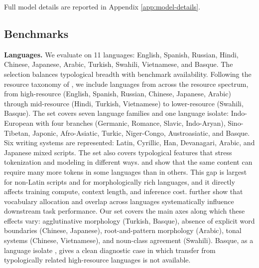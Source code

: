 \documentclass{article}
\begin{document}
Full model details are reported in Appendix \ref{app:model-details}.

\subsection{Benchmarks}
\label{subsec:methodology-benchmarks}

\textbf{Languages.} We evaluate on 11 languages: English, Spanish, Russian, Hindi, Chinese, Japanese, Arabic, Turkish, Swahili, Vietnamese, and Basque. The selection balances typological breadth with benchmark availability. Following the resource taxonomy of \cite{joshi-etal-2020-language-resources}, we include languages from across the resource spectrum, from high-resource (English, Spanish, Russian, Chinese, Japanese, Arabic) through mid-resource (Hindi, Turkish, Vietnamese) to lower-resource (Swahili, Basque). The set covers seven language families and one language isolate: Indo-European with four branches (Germanic, Romance, Slavic, Indo-Aryan), Sino-Tibetan, Japonic, Afro-Asiatic, Turkic, Niger-Congo, Austroasiatic, and Basque. Six writing systems are represented: Latin, Cyrillic, Han, Devanagari, Arabic, and Japanese mixed scripts. The set also covers typological features that stress tokenization and modeling in different ways. \cite{petrov2023tokenizersunfairness} and \cite{ahia-etal-2023-tokenization-cost} show that the same content can require many more tokens in some languages than in others.
This gap is largest for non-Latin scripts and for morphologically rich languages, and it directly affects training compute, context length, and inference cost. \cite{limisiewicz-etal-2023-tokenization-vocabulary} further show that vocabulary allocation and overlap across languages systematically influence downstream task performance. Our set covers the main axes along which these effects vary: agglutinative morphology (Turkish, Basque), absence of explicit word boundaries (Chinese, Japanese), root-and-pattern morphology (Arabic), tonal systems (Chinese, Vietnamese), and noun-class agreement (Swahili). Basque, as a language isolate \cite{Campbell2010LanguageIsolates}, gives a clean diagnostic case in which transfer from typologically related high-resource languages is not available.
\end{document}
